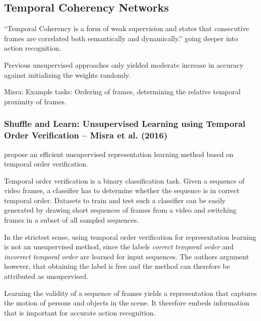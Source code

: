 \subsection{Temporal Coherency Networks}
``Temporal Coherency is a form of weak supervision and states that consecutive frames are correlated both semantically and dynamically.'' going deeper into action recognition.

Previous unsupervised approaches only yielded moderate increase in accuracy against initializing the weights randomly.

Misra:
Example tasks: Ordering of frames, determining the relative temporal proximity of frames.





\subsubsection{Shuffle and Learn: Unsupervised Learning using Temporal Order Verification -- Misra et al. (2016)}
\cite{misra_shuffle_2016}

\textcite{misra_shuffle_2016} propose an efficient unsupervised representation learning method based on temporal order verification.

Temporal order verification is a binary classification task. Given a sequence of video frames, a classifier has to determine whether the sequence is in correct temporal order.
Datasets to train and test such a classifier can be easily generated by drawing short sequences of frames from a video and switching frames in a subset of all sampled sequences.

In the strictest sense, using temporal order verification for representation learning is not an unsupervised method, since the labels \textit{correct temporal order} and \textit{incorrect temporal order} are learned for input sequences.
The authors argument however, that obtaining the label is free and the method can therefore be attributed as unsupervised.

Learning the validity of a sequence of frames yields a representation that captures the motion of persons and objects in the scene. It therefore embeds information that is important for accurate action recognition.

